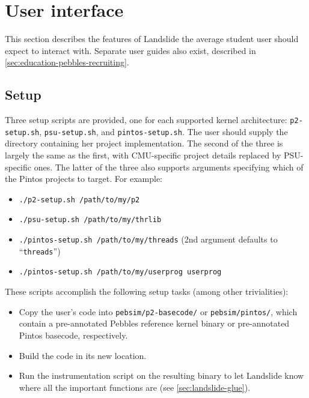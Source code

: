 \section{User interface}

This section describes the features of Landslide the average student user should expect to interact with.
Separate user guides also exist, described in \cref{sec:education-pebbles-recruiting}.


\subsection{Setup}
\label{sec:landslide-setup}

Three setup scripts are provided, one for each supported kernel architecture: {\tt p2-setup.sh}, {\tt psu-setup.sh}, and {\tt pintos-setup.sh}.
The user should supply the directory containing her project implementation.
The second of the three is largely the same as the first, with CMU-specific project details replaced by PSU-specific ones.
The latter of the three also supports arguments specifying which of the Pintos projects to target.
For example:
\begin{itemize}
	\item {\tt ./p2-setup.sh /path/to/my/p2}
	\item {\tt ./psu-setup.sh /path/to/my/thrlib}
	\item {\tt ./pintos-setup.sh /path/to/my/threads} (2nd argument defaults to ``{\tt threads}'')
	\item {\tt ./pintos-setup.sh /path/to/my/userprog userprog}
\end{itemize}

These scripts accomplish the following setup tasks (among other trivialities):
\begin{itemize}
	\item Copy the user's code into {\tt pebsim/p2-basecode/} or {\tt pebsim/pintos/},
		which contain a pre-annotated Pebbles reference kernel binary or pre-annotated Pintos basecode, respectively.
	\item Build the code in its new location.
	\item Run the instrumentation script on the resulting binary to let Landslide know where all the important functions are
		(see \cref{sec:landslide-glue}).
\end{itemize}


